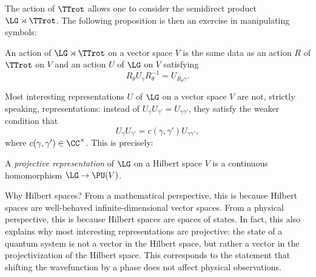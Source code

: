 The action of $\TTrot$ allows one to consider the semidirect product $\LG \rtimes \TTrot$. The following proposition is then an exercise in manipulating
symbols:
\begin{prop}
	An action of $\LG \rtimes \TTrot$ on a vector space $V$ is the same data as
	an action $R$ of $\TTrot$ on $V$ and an action $U$ of $\LG$ on $V$
	satisfying
	$$R_\theta U_\gamma R_\theta^{-1} = U_{R_\theta \gamma}.$$
\end{prop}
Most interesting representations $U$ of $\LG$ on a vector space $V$ are not, strictly speaking, representations:
instead of $U_\gamma U_{\gamma'} = U_{\gamma\gamma'}$, they satisfy the weaker condition that
\begin{equation}
	U_\gamma U_{\gamma'} = c(\gamma, \gamma') U_{\gamma \gamma'},
\end{equation}
where $c(\gamma, \gamma')\in \CC^\times$. This is precisely:
\begin{definition}
	A \emph{projective representation} of $\LG$ on a Hilbert space $V$ is a
	continuous homomorphism $\LG \to \PU(V)$.
\end{definition}

\begin{remark}
	Why Hilbert spaces? From a mathematical perspective, this is because Hilbert
	spaces are well-behaved infinite-dimensional vector spaces. From a physical
	perspective, this is because Hilbert spaces are spaces of states. In fact,
	this also explains why most interesting representations are projective: the
	state of a quantum system is not a vector in the Hilbert space, but rather a
	vector in the projectivization of the Hilbert space. This corresponds to the
	statement that shifting the wavefunction by a phase does not affect physical
	observations.
\end{remark}

